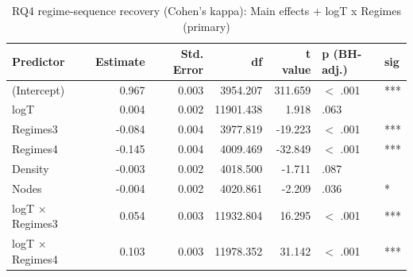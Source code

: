 \begin{table}[ht]
\centering
\begin{tabular}{lrrrrll}
  \hline
Predictor & Estimate & Std. Error & df & t value & p (BH-adj.) & sig \\ 
  \hline
(Intercept) & 0.967 & 0.003 & 3954.207 & 311.659 & $<$ .001 & *** \\ 
  logT & 0.004 & 0.002 & 11901.438 & 1.918 & .063 &  \\ 
  Regimes3 & -0.084 & 0.004 & 3977.819 & -19.223 & $<$ .001 & *** \\ 
  Regimes4 & -0.145 & 0.004 & 4009.469 & -32.849 & $<$ .001 & *** \\ 
  Density & -0.003 & 0.002 & 4018.500 & -1.711 & .087 &  \\ 
  Nodes & -0.004 & 0.002 & 4020.861 & -2.209 & .036 & * \\ 
  logT × Regimes3 & 0.054 & 0.003 & 11932.804 & 16.295 & $<$ .001 & *** \\ 
  logT × Regimes4 & 0.103 & 0.003 & 11978.352 & 31.142 & $<$ .001 & *** \\ 
   \hline
\end{tabular}
\caption{RQ4 regime-sequence recovery (Cohen's kappa): Main effects + logT x Regimes (primary)} 
\end{table}
